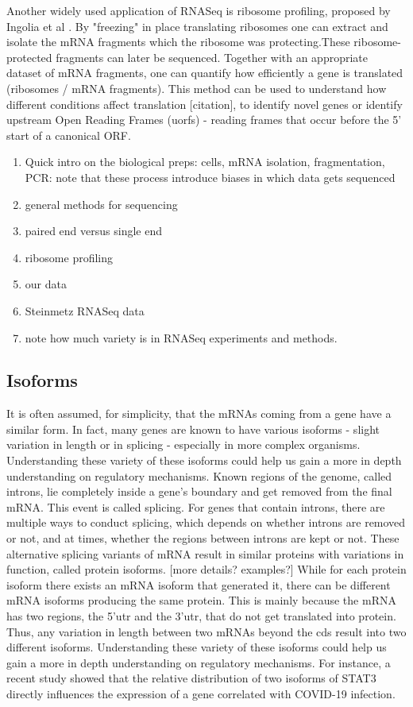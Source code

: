 \documentclass[12pt]{article}
\begin{document}
    Another widely used application of RNASeq is ribosome profiling, proposed by Ingolia et al \cite{Ingolia2012}. By "freezing" in place translating ribosomes one can extract and isolate the mRNA fragments which the ribosome was protecting.These ribosome-protected fragments can later be sequenced. Together with an appropriate dataset of mRNA fragments, one can quantify how efficiently a gene is translated (ribosomes / mRNA fragments). This method can be used to understand how different conditions affect translation [citation], to identify novel genes or identify upstream Open Reading Frames (u\acrshort{orf}s) - reading frames that occur before the 5' start of a canonical \gls{ORF}.
    
    
\begin{enumerate}
    \item Quick intro on the biological preps: cells, mRNA isolation, fragmentation, PCR: note that these process introduce biases in which data gets sequenced
    \item general methods for sequencing
    \item paired end versus single end
    \item ribosome profiling
    \item our data
    \item Steinmetz RNASeq data
    \item note how much variety is in  RNASeq experiments and methods. 
\end{enumerate}

\subsection{Isoforms}
It is often assumed, for simplicity, that the mRNAs coming from a gene have a similar form. In fact, many genes are known to have various isoforms - slight variation in length or in splicing - especially in more complex organisms. Understanding these variety of these isoforms could help us gain a more in depth understanding on regulatory mechanisms. Known regions of the genome, called introns, lie completely inside a gene's boundary and get removed from the final mRNA. This event is called splicing. For genes that contain introns, there are multiple ways to conduct splicing, which depends on whether introns are removed or not, and at times, whether the regions between introns are kept or not. These alternative splicing variants of mRNA result in similar proteins with variations in function, called protein isoforms. [more details? examples?] 
While for each protein isoform there exists an mRNA isoform that generated it, there can be different mRNA isoforms producing the same protein. This is mainly because the mRNA has two regions, the 5'\acrshort{utr} and the 3'\acrshort{utr}, that do not get translated into protein. Thus, any variation in length between two mRNAs beyond the \gls{cds} result into two different isoforms. Understanding these variety of these isoforms could help us gain a more in depth understanding on regulatory mechanisms. For instance, a recent study \cite{Shamir2020} showed that the relative distribution of two isoforms of STAT3 directly influences the expression of a gene correlated with COVID-19 infection. 
\end{document}
